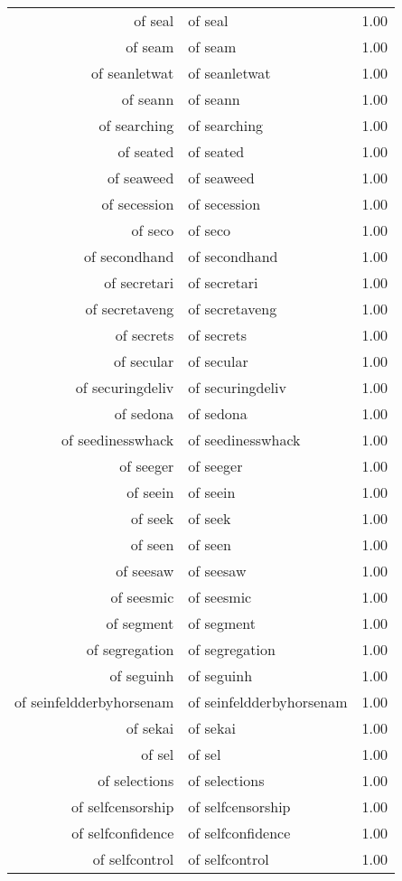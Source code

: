 \begin{table}[ht]
\begin{tabular}{rlr}
  of seal & of seal & 1.00 \\ 
  of seam & of seam & 1.00 \\ 
  of seanletwat & of seanletwat & 1.00 \\ 
  of seann & of seann & 1.00 \\ 
  of searching & of searching & 1.00 \\ 
  of seated & of seated & 1.00 \\ 
  of seaweed & of seaweed & 1.00 \\ 
  of secession & of secession & 1.00 \\ 
  of seco & of seco & 1.00 \\ 
  of secondhand & of secondhand & 1.00 \\ 
  of secretari & of secretari & 1.00 \\ 
  of secretaveng & of secretaveng & 1.00 \\ 
  of secrets & of secrets & 1.00 \\ 
  of secular & of secular & 1.00 \\ 
  of securingdeliv & of securingdeliv & 1.00 \\ 
  of sedona & of sedona & 1.00 \\ 
  of seedinesswhack & of seedinesswhack & 1.00 \\ 
  of seeger & of seeger & 1.00 \\ 
  of seein & of seein & 1.00 \\ 
  of seek & of seek & 1.00 \\ 
  of seen & of seen & 1.00 \\ 
  of seesaw & of seesaw & 1.00 \\ 
  of seesmic & of seesmic & 1.00 \\ 
  of segment & of segment & 1.00 \\ 
  of segregation & of segregation & 1.00 \\ 
  of seguinh & of seguinh & 1.00 \\ 
  of seinfeldderbyhorsenam & of seinfeldderbyhorsenam & 1.00 \\ 
  of sekai & of sekai & 1.00 \\ 
  of sel & of sel & 1.00 \\ 
  of selections & of selections & 1.00 \\ 
  of selfcensorship & of selfcensorship & 1.00 \\ 
  of selfconfidence & of selfconfidence & 1.00 \\ 
  of selfcontrol & of selfcontrol & 1.00 \\ 

\end{tabular}
\end{table}
